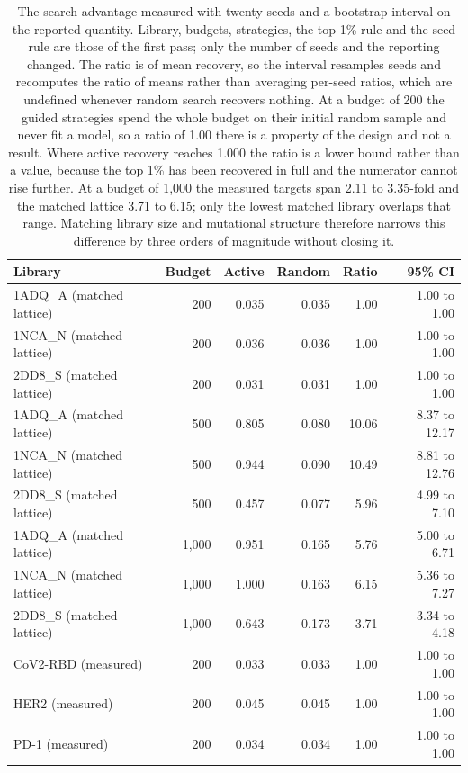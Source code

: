 \documentclass[11pt,a4paper]{article}
\begin{document}
\begin{table}[h]
\caption{The search advantage measured with twenty seeds and a bootstrap interval on the reported quantity. Library, budgets, strategies, the top-1\% rule and the seed rule are those of the first pass; only the number of seeds and the reporting changed. The ratio is of mean recovery, so the interval resamples seeds and recomputes the ratio of means rather than averaging per-seed ratios, which are undefined whenever random search recovers nothing. At a budget of 200 the guided strategies spend the whole budget on their initial random sample and never fit a model, so a ratio of 1.00 there is a property of the design and not a result. Where active recovery reaches 1.000 the ratio is a lower bound rather than a value, because the top 1\% has been recovered in full and the numerator cannot rise further. At a budget of 1{,}000 the measured targets span 2.11 to 3.35-fold and the matched lattice 3.71 to 6.15; only the lowest matched library overlaps that range. Matching library size and mutational structure therefore narrows this difference by three orders of magnitude without closing it.}
\centering
\begin{tabular}{@{}lrrrrr@{}}
\toprule
Library & Budget & Active & Random & Ratio & 95\% CI \\
\midrule
1ADQ\_A (matched lattice) & 200 & 0.035 & 0.035 & 1.00 & 1.00 to 1.00 \\
1NCA\_N (matched lattice) & 200 & 0.036 & 0.036 & 1.00 & 1.00 to 1.00 \\
2DD8\_S (matched lattice) & 200 & 0.031 & 0.031 & 1.00 & 1.00 to 1.00 \\
1ADQ\_A (matched lattice) & 500 & 0.805 & 0.080 & 10.06 & 8.37 to 12.17 \\
1NCA\_N (matched lattice) & 500 & 0.944 & 0.090 & 10.49 & 8.81 to 12.76 \\
2DD8\_S (matched lattice) & 500 & 0.457 & 0.077 & 5.96 & 4.99 to 7.10 \\
1ADQ\_A (matched lattice) & 1,000 & 0.951 & 0.165 & 5.76 & 5.00 to 6.71 \\
1NCA\_N (matched lattice) & 1,000 & 1.000 & 0.163 & 6.15 & 5.36 to 7.27 \\
2DD8\_S (matched lattice) & 1,000 & 0.643 & 0.173 & 3.71 & 3.34 to 4.18 \\
\midrule
CoV2-RBD (measured) & 200 & 0.033 & 0.033 & 1.00 & 1.00 to 1.00 \\
HER2 (measured) & 200 & 0.045 & 0.045 & 1.00 & 1.00 to 1.00 \\
PD-1 (measured) & 200 & 0.034 & 0.034 & 1.00 & 1.00 to 1.00 \\

\end{tabular}
\end{table}
\end{document}
